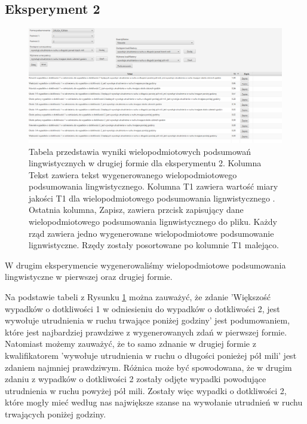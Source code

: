\documentclass{classrep}
\begin{document}
\newpage
\subsection{Eksperyment 2}
\label{section:ex_wiel2}

\begin{figure}[h!]
 \centering
 \includegraphics[width=15cm]{ex_wiel2.png}
 \vspace{-0.3cm}
 \caption{Tabela przedstawia wyniki wielopodmiotowych podsumowań lingwistycznych w drugiej formie dla eksperymentu 2. Kolumna Tekst zawiera tekst wygenerowanego wielopodmiotowego podsumowania lingwistycznego. Kolumna T1 zawiera wartość miary jakości T1 dla wielopodmiotowego podsumowania lignwistycznego \cite{niewiadomski19}. Ostatnia kolumna, Zapisz, zawiera przcisk zapisujący dane wielopodmiotowego podsumowania lignwistycznego do pliku. Każdy rząd zawiera jedno wygenerowane wielopodmiotowe podsumowanie lignwistyczne. Rzędy zostały posortowane po kolumnie T1 malejąco.  }
 \label{wykr_ex_wiel2}
\end{figure}

W drugim eksperymencie wygenerowaliśmy wielopodmiotowe podsumowania lingwistyczne w pierwszej oraz drugiej formie. 

Na podstawie tabeli z Rysunku \ref{wykr_ex_wiel2} można zauważyć, że zdanie 'Większość wypadków o dotkliwości 1 w odniesieniu do wypadków o dotkliwości 2, jest wywołuje utrudnienia w ruchu trwające poniżej godziny' jest podumowaniem, które jest najbardziej prawdziwe z wygenerowanych zdań w pierwszej formie. Natomiast możemy zauważyć, że to samo zdnanie w drugiej formie z kwalifikatorem 'wywołuje utrudnienia w ruchu o długości ponieżej pół mili' jest zdaniem najmniej prawdziwym. Różnica może być spowodowana, że w drugim zdaniu z wypadków o dotkliwości 2 zostały odjęte wypadki powodujące utrudnienia w ruchu powyżej pół mili. Zostały więc wypadki o dotkliwości 2, które mogły mieć według nas największe szanse na wywołanie utrudnień w ruchu trwających poniżej godziny. 
\end{document}
